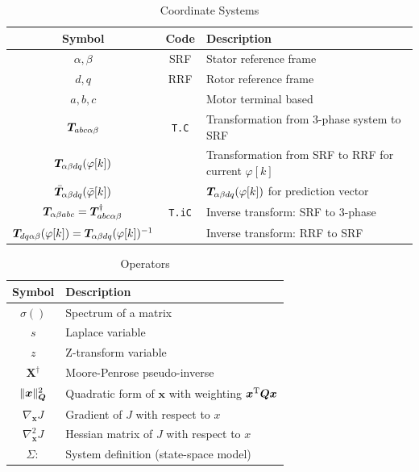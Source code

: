 \begin{table}[H]
	\centering
	\caption{Coordinate Systems}
	\begin{tabular}{c|c|l}
		Symbol & Code & Description \\
		\hline
		$\alpha, \beta$ & SRF & Stator reference frame \\
		$d, q$ & RRF & Rotor reference frame \\
		$a, b, c$ & & Motor terminal based \\
		$\bm{T}_{abc \alpha \beta }$ & \verb|T.C| & Transformation from 3-phase system to SRF \\
		$\bm{T}_{\alpha \beta d q}(\varphi [k])$ & & Transformation from SRF to RRF for current $\varphi[k]$ \\
		$\Bar{\bm{T}}_{\alpha \beta d q}(\Bar{\varphi} [k])$ & & $\bm{T}_{\alpha \beta d q}(\varphi [k])$ for prediction vector \\
		$\bm{T}_{\alpha \beta abc } = \bm{T}_{abc \alpha \beta }^{\dagger}$ & \verb|T.iC| & Inverse transform: SRF to 3-phase \\
		$\bm{T}_{ d q \alpha \beta}(\varphi [k]) = \bm{T}_{\alpha \beta d q}(\varphi [k])^{-1}$ & & Inverse transform: RRF to SRF \\
	\end{tabular}
\end{table}

\begin{table}[H]
	\centering
	\caption{Operators}
	\begin{tabular}{c|l}
		Symbol & Description \\
		\hline
		$\sigma()$ & Spectrum of a matrix \\
		$s$ & Laplace variable \\
		$z$ & Z-transform variable \\
		$\bm{X}^{\dagger}$ & Moore-Penrose pseudo-inverse \\
		$\| \bm{{x}} \|_{\bm{Q}}^2$ & Quadratic form of $\bm{x}$ with weighting ${\bm{x}}^{\mathrm{T}} \bm{Q} {\bm{x}}$ \\
		$\nabla_{\bm{x}} J$ & Gradient of $J$ with respect to $x$ \\
		$\nabla_{\bm{x}}^2 J$ & Hessian matrix of $J$ with respect to $x$ \\
		$\Sigma:$ & System definition (state-space model) \\
	\end{tabular}
\end{table}
